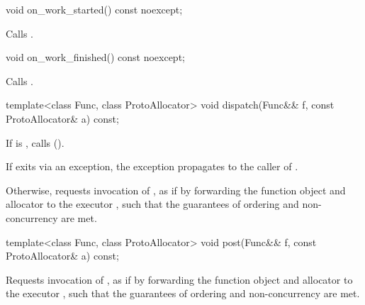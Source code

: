 %
\begin{itemdecl}
void on_work_started() const noexcept;
\end{itemdecl}

\begin{itemdescr}
\pnum
\effects Calls .
\end{itemdescr}

%
\begin{itemdecl}
void on_work_finished() const noexcept;
\end{itemdecl}

\begin{itemdescr}
\pnum
\effects Calls .
\end{itemdescr}

%
\begin{itemdecl}
template<class Func, class ProtoAllocator>
  void dispatch(Func&& f, const ProtoAllocator& a) const;
\end{itemdecl}

\begin{itemdescr}
\pnum
\effects If  is , calls  (). \begin{note} If  exits via an exception, the exception propagates to the caller of . \end{note} Otherwise, requests invocation of , as if by forwarding the function object  and allocator  to the executor , such that the guarantees of ordering and non-concurrency are met.
\end{itemdescr}

%
\begin{itemdecl}
template<class Func, class ProtoAllocator>
  void post(Func&& f, const ProtoAllocator& a) const;
\end{itemdecl}

\begin{itemdescr}
\pnum
\effects Requests invocation of , as if by forwarding the function object  and allocator  to the executor , such that the guarantees of ordering and non-concurrency are met.
\end{itemdescr}

